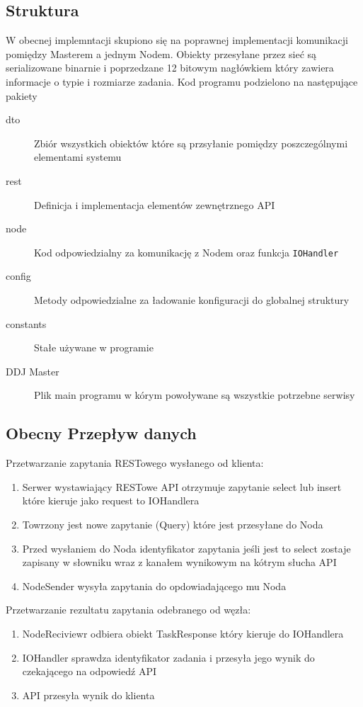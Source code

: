 \documentclass[paper=a4, fontsize=11pt]{scrartcl} %
\numberwithin{equation}{section} %
\numberwithin{figure}{section} %
\numberwithin{table}{section} %
\begin{document}
	\subsection{Struktura}
		W obecnej implemntacji skupiono się na poprawnej implementacji komunikacji pomiędzy Masterem a jednym Nodem.
		Obiekty przesyłane przez sieć są serializowane binarnie i poprzedzane 12 bitowym nagłówkiem który zawiera informacje
		o typie i rozmiarze zadania. Kod programu podzielono na następujące pakiety
		\begin{description}
			\item[dto] Zbiór wszystkich obiektów które są przsyłanie pomiędzy poszczególnymi elementami systemu
			\item[rest] Definicja i implementacja elementów zewnętrznego API
			\item[node] Kod odpowiedzialny za komunikację z Nodem oraz funkcja \texttt{IOHandler}
			\item[config] Metody odpowiedzialne za ładowanie konfiguracji do globalnej struktury
			\item[constants] Stałe używane w programie
			\item[DDJ Master] Plik main programu w kórym powoływane są wszystkie potrzebne serwisy
		\end{description}

	\subsection{Obecny Przepływ danych}
		Przetwarzanie zapytania RESTowego wysłanego od klienta:
		\begin{enumerate}
			\item Serwer wystawiający RESTowe API otrzymuje zapytanie select lub insert które kieruje jako request to IOHandlera
			\item Towrzony jest nowe zapytanie (Query) które jest przesyłane do Noda
			\item Przed wysłaniem do Noda identyfikator zapytania jeśli jest to select zostaje zapisany w słowniku wraz z kanałem 
			wynikowym na kótrym słucha API
			\item NodeSender wysyła zapytania do opdowiadającego mu Noda
		\end{enumerate}
		Przetwarzanie rezultatu zapytania odebranego od węzła:
		\begin{enumerate}
			\item NodeReciviewr odbiera obiekt TaskResponse który kieruje do IOHandlera
			\item IOHandler sprawdza identyfikator zadania i przesyła jego wynik do czekającego na odpowiedź API
			\item API przesyła wynik do klienta
		\end{enumerate}
\end{document}
